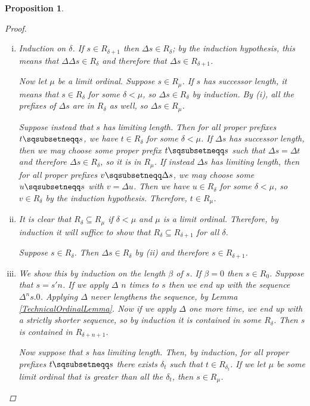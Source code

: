 \documentclass[11pt]{article} %
\theoremstyle{plain} %
\newtheorem{proposition}[theorem]{Proposition}
\theoremstyle{definition} %
\theoremstyle{note}
\theoremstyle{exercisestyle}
\newcommand{\pprefix}{\sqsubsetneqq}
\renewcommand{\subset}{\subseteq}
\begin{document}
\begin{proposition}
\begin{proof}
\begin{enumerate}[(i): ]
      \item Induction on $\delta$.  If $s\in R_{\delta+1}$ then $\Delta s\in R_\delta$; by the induction hypothesis, this means that $\Delta\Delta s\in R_\delta$ and therefore that $\Delta s\in R_{\delta+1}$.  

        Now let $\mu$ be a limit ordinal.  Suppose $s\in R_\mu$.  If $s$ has successor length, it means that $s\in R_\delta$ for some $\delta<\mu$, so $\Delta s\in R_\delta$ by induction.  By (i), all the prefixes of $\Delta s$ are in $R_\delta$ as well, so $\Delta s\in R_\mu$.  

        Suppose instead that $s$ has limiting length.  Then for all proper prefixes $t\pprefix s$, we have $t\in R_\delta$ for some $\delta<\mu$.  If $\Delta s$ has successor length, then we may choose some proper prefix $t\pprefix s$ such that $\Delta s = \Delta t$ and therefore $\Delta s\in R_\delta$, so it is in $R_\mu$.  If instead $\Delta s$ has limiting length, then for all proper prefixes $v\pprefix\Delta s$, we may choose some $u\pprefix s$ with $v=\Delta u$.  Then we have $u\in R_\delta$ for some $\delta<\mu$, so $v\in R_\delta$ by the induction hypothesis.  Therefore, $t\in R_\mu$.  

      \item It is clear that $R_\delta\subset R_\mu$ if $\delta<\mu$ and $\mu$ is a limit ordinal.  Therefore, by induction it will suffice to show that $R_\delta\subset R_{\delta+1}$ for all $\delta$.  

        Suppose $s\in R_\delta$.  Then $\Delta s\in R_\delta$ by (ii) and therefore $s\in R_{\delta+1}$.  

      \item We show this by induction on the length $\beta$ of $s$.  If $\beta=0$ then $s\in R_0$.  Suppose that $s=s'n$.  If we apply $\Delta$ $n$ times to $s$ then we end up with the sequence $\Delta^ns .0$.  Applying $\Delta$ never lengthens the sequence, by Lemma \ref{TechnicalOrdinalLemma}.  Now if we apply $\Delta$ one more time, we end up with a strictly shorter sequence, so by induction it is contained in some $R_\delta$.  Then $s$ is contained in $R_{\delta+n+1}$.  

        Now suppose that $s$ has limiting length.  Then, by induction, for all proper prefixes $t\pprefix s$ there exists $\delta_t$ such that $t\in R_{\delta_t}$.  If we let $\mu$ be some limit ordinal that is greater than all the $\delta_t$, then $s\in R_\mu$.  \qedhere
    \end{enumerate}
  \end{proof}
\end{proposition}
\end{document}

